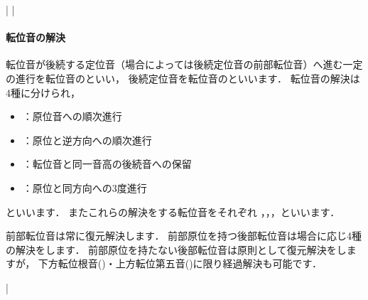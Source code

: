 \documentclass[dvipdfmx,uplatex,b5paper,openany,jbase=12Q,nomag*,textwidth-limit=44%
               ]{gachimuchi}
\begin{document}
\begin{Music}[0.6\linewidth]
  \nostartrule%
  \Startpiece%
  \znotes%
  \en\NOtes%
  \en\bar%
  \NOTes%
  \en\doublebar%
  \znotes%
  \en\NOtes%
  \en\bar%
  \NOtes%
  \en\NOtes%
  \en\setdoublebar%
  \endpiece%
\end{Music}

\paragraph{転位音の解決}
転位音が後続する定位音（場合によっては後続定位音の前部転位音）へ進む一定の進行を転位音のといい，
後続定位音を転位音のといいます．
転位音の解決は4種に分けられ，
\begin{itemize}
  \item {}：原位音への順次進行
  \item {}：原位と逆方向への順次進行
  \item {}：転位音と同一音高の後続音への保留
  \item {}：原位と同方向への3度進行
\end{itemize}
といいます．
またこれらの解決をする転位音をそれぞれ
，，，といいます．

前部転位音は常に復元解決します．
前部原位を持つ後部転位音は場合に応じ4種の解決をします．
前部原位を持たない後部転位音は原則として復元解決をしますが，
下方転位根音()・上方転位第五音()に限り経過解決も可能です．
\begin{floatMusic}[width=0.9\linewidth]
  \nostartrule%
  \Startpiece%
  \NOTes{}%
  \en\doublebar%
  \NOtes{}%
  \en\doublebar%
  \NOtes{}%
  \en\doublebar%
  \NOTes{}%
  \en\bar\NOtes{}%
  \en\setdoublebar%
  \endpiece%
\end{floatMusic}
\end{document}
